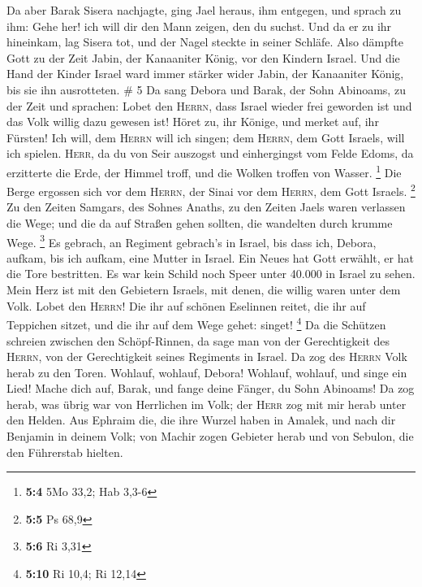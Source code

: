  Da aber Barak Sisera nachjagte, ging Jael heraus, ihm
entgegen, und sprach zu ihm: Gehe her! ich will dir den Mann zeigen, den
du suchst. Und da er zu ihr hineinkam, lag Sisera tot, und der Nagel
steckte in seiner Schläfe.  Also dämpfte Gott zu der Zeit
Jabin, der Kanaaniter König, vor den Kindern Israel.  Und
die Hand der Kinder Israel ward immer stärker wider Jabin, der
Kanaaniter König, bis sie ihn ausrotteten. \# 5  Da sang
Debora und Barak, der Sohn Abinoams, zu der Zeit und sprachen:
 Lobet den \textsc{Herrn}, dass Israel wieder frei
geworden ist und das Volk willig dazu gewesen ist!  Höret
zu, ihr Könige, und merket auf, ihr Fürsten! Ich will, dem
\textsc{Herrn} will ich singen; dem \textsc{Herrn}, dem Gott Israels,
will ich spielen.  \textsc{Herr}, da du von Seir auszogst
und einhergingst vom Felde Edoms, da erzitterte die Erde, der Himmel
troff, und die Wolken troffen von Wasser. \footnote{\textbf{5:4} 5Mo
  33,2; Hab 3,3-6}  Die Berge ergossen sich vor dem
\textsc{Herrn}, der Sinai vor dem \textsc{Herrn}, dem Gott Israels.
\footnote{\textbf{5:5} Ps 68,9}  Zu den Zeiten Samgars,
des Sohnes Anaths, zu den Zeiten Jaels waren verlassen die Wege; und die
da auf Straßen gehen sollten, die wandelten durch krumme Wege.
\footnote{\textbf{5:6} Ri 3,31}  Es gebrach, an Regiment
gebrach's in Israel, bis dass ich, Debora, aufkam, bis ich aufkam, eine
Mutter in Israel.  Ein Neues hat Gott erwählt, er hat die
Tore bestritten. Es war kein Schild noch Speer unter 40.000 in Israel zu
sehen.  Mein Herz ist mit den Gebietern Israels, mit
denen, die willig waren unter dem Volk. Lobet den \textsc{Herrn}!
 Die ihr auf schönen Eselinnen reitet, die ihr auf
Teppichen sitzet, und die ihr auf dem Wege gehet: singet! \footnote{\textbf{5:10}
  Ri 10,4; Ri 12,14}  Da die Schützen schreien zwischen
den Schöpf-Rinnen, da sage man von der Gerechtigkeit des \textsc{Herrn},
von der Gerechtigkeit seines Regiments in Israel. Da zog des
\textsc{Herrn} Volk herab zu den Toren.  Wohlauf,
wohlauf, Debora! Wohlauf, wohlauf, und singe ein Lied! Mache dich auf,
Barak, und fange deine Fänger, du Sohn Abinoams!  Da zog
herab, was übrig war von Herrlichen im Volk; der \textsc{Herr} zog mit
mir herab unter den Helden.  Aus Ephraim die, die ihre
Wurzel haben in Amalek, und nach dir Benjamin in deinem Volk; von Machir
zogen Gebieter herab und von Sebulon, die den Führerstab hielten.
